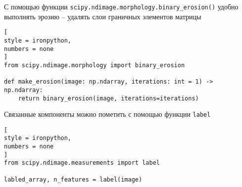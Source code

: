 \documentclass[%
	11pt,
	a4paper,
	utf8,
		]{article}
\begin{document}
С помощью функции \verb|scipy.ndimage.morphology.binary_erosion()| удобно выполнять эрозию -- удалять слои граничных элементов матрицы
\begin{lstlisting}[
style = ironpython,
numbers = none
]
from scipy.ndimage.morphology import binary_erosion

def make_erosion(image: np.ndarray, iterations: int = 1) -> np.ndarray:
    return binary_erosion(image, iterations=iterations)
\end{lstlisting}

Связанные компоненты можно пометить с помощью функции \verb|label|
\begin{lstlisting}[
style = ironpython,
numbers = none
]
from scipy.ndimage.measurements import label

labled_array, n_features = label(image)
\end{lstlisting}








\begin{thebibliography}{99}
	
\end{thebibliography}


\end{document}
